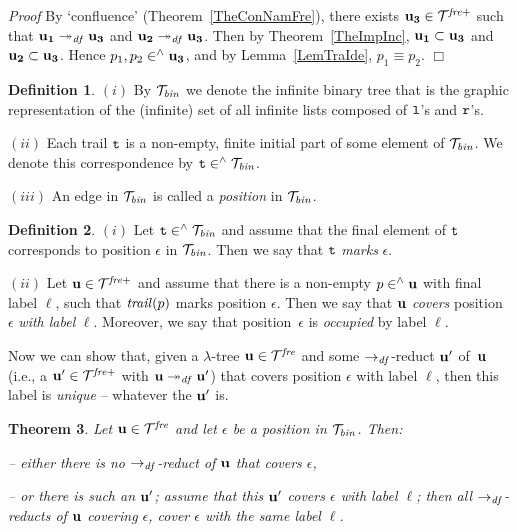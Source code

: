 \documentclass{article}
\theoremstyle{plain}
\newtheorem{The}{Theorem}[section]
\theoremstyle{definition}
\newtheorem{Def}[The]{Definition}
\begin{document}
{{\it Proof\/} By `confluence' (Theorem~\ref{TheConNamFre}), there exists ${\bf u_3} \in {\cal T}^{\it fre+}$ such that ${\bf u_1} \twoheadrightarrow_{\it df} {\bf u_3}$ and ${\bf u_2} \twoheadrightarrow_{\it df} {\bf u_3}$. Then by Theorem~\ref{TheImpInc}, ${\bf u_1} \subset {\bf u_3}$ and ${\bf u_2} \subset {\bf u_3}$. Hence $p_1, p_2 \in^\wedge {\bf u_3}$, and by Lemma~\ref{LemTraIde}, $p_1 \equiv p_2$. $\Box$

\medskip

\begin{Def} $(i)$ By ${\cal T}_{\it bin}$ we denote the infinite binary tree that is the graphic representation of the (infinite) set of all infinite lists composed of ${\tt l}$'s and ${\tt r}$'s.

$(ii)$ Each trail ${\tt t}$ is a non-empty, finite initial part of some element of ${\cal T}_{\it bin}$. We denote this correspondence by ${\tt t} \in^\wedge {\cal T}_{\it bin}$.

$(iii)$ An edge in ${\cal T}_{\it bin}$ is called a {\em position\/} in ${\cal T}_{\it bin}$.
\end{Def}

\begin{Def}

$(i)$ Let ${\tt t} \in^\wedge {\cal T}_{\it bin}$ and assume that the final element of ${\tt t}$ corresponds to position $\epsilon$ in ${\cal T}_{\it bin}$. Then we say that ${\tt t}$ {\em marks\/} $\epsilon$.

$(ii)$ Let ${\bf u} \in {\cal T}^{\it fre+}$ and assume that there is a non-empty $p \in^\wedge {\bf u}$ with final label $\ell$, such that ${\it trail\/} (p)$ marks position $\epsilon$. Then we say that ${\bf u}$ {\it covers\/} position~$\epsilon$ {\it with label\/} $\ell$. Moreover, we say that position~$\epsilon$ is {\it occupied\/} by label $\ell$.
\end{Def}

Now we can show that, given a $\lambda$-tree ${\bf u} \in {\cal T}^{\it fre}$ and some $\rightarrow_{\it df}$-reduct ${\bf u}'$ of~${\bf u}$ (i.e., a ${\bf u}' \in {\cal T}^{\it fre+}$ with ${\bf u} \twoheadrightarrow_{\it df} {\bf u}'$) that covers position $\epsilon$ with label $\ell$, then this label is {\em unique\/} -- whatever the ${\bf u}'$ is.

\begin{The}
Let ${\bf u} \in {\cal T}^{\it fre}$ and let $\epsilon$ be a position in ${\cal T}_{\it bin}$. Then:

-- {\em either} there is no $\rightarrow_{\it df}$-reduct of ${\bf u}$ that covers $\epsilon$,

-- {\em or} there is such an ${\bf u}'$; assume that this ${\bf u}'$ covers $\epsilon$ with label $\ell$; then {\em all} $\rightarrow_{\it df}$-reducts of ${\bf u}$ covering $\epsilon$, cover $\epsilon$ with the same label $\ell$.
\end{The}

}
\end{document}
